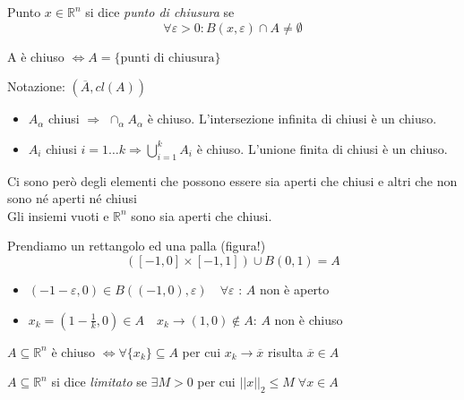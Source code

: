 \begin{defn} 
 Punto $x \in \mathbb{R}^{n}$ si dice \emph{punto di chiusura} se
 $$ \forall \varepsilon > 0: B(x, \varepsilon) \cap A \neq \emptyset $$
\end{defn}

\begin{property}
 A è chiuso $\Longleftrightarrow  A = \{ \text{punti di chiusura} \}$
\end{property}
Notazione:
$(\overline{A}, cl(A))$


\begin{property}
\begin{itemize}
 \item $A_{\alpha}$ chiusi $\Rightarrow$ $\cap_{\alpha} A_{\alpha}$ è chiuso.
  L'intersezione infinita di chiusi è un chiuso.
 \item $A_{i}$ chiusi $i=1 \ldots k \Rightarrow 
\displaystyle \bigcup_{i=1}^{k}A_{i}$ è chiuso.
L'unione finita di chiusi è un chiuso.
\end{itemize}

Ci sono per\`o degli elementi che possono essere sia aperti che chiusi e altri che non sono né aperti né chiusi \\
Gli insiemi vuoti e $\mathbb{R}^{n}$ sono sia aperti che chiusi.
\end{property}

\begin{example}
 Prendiamo un rettangolo ed una palla (figura!)
$$([-1,0] \times [-1,1]) \cup B(0,1) = A$$
\begin{itemize}
\item 
   $(-1- \varepsilon, 0) \in B((-1,0),\varepsilon) \quad \forall \varepsilon$
   :  $A$ non è aperto
\item 
   $x_k = (1 - \frac{1}{k},0) \in A \quad x_k \rightarrow (1,0) 
 \notin A $: $A$ non è chiuso
\end{itemize}
\end{example}

\begin{property}
$A \subseteq \mathbb{R}^n $ è chiuso $\Longleftrightarrow
 \forall \{ x_k \} \subseteq A $ per cui $x_k  \rightarrow \overline{x}$
risulta $\overline{x} \in A $
\end{property}

\begin{defn}
$A \subseteq \mathbb{R}^{n}$ si dice \emph{limitato}  se $\exists M > 0$ per cui
$|| x ||_{2} \leq M \; \forall x \in A $
\end{defn}

